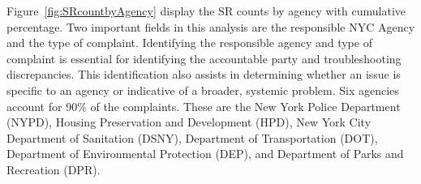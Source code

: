 \documentclass[12pt, titlepage]{article}
\begin{document}
Figure~\ref{fig:SRcountbyAgency} display the SR counts by agency with
cumulative percentage. Two important fields in this analysis are the
responsible NYC Agency and the type of complaint. Identifying the 
responsible agency and type of complaint is essential 
for identifying the accountable party and troubleshooting discrepancies. 
This identification also assists in determining whether an issue is 
specific to an agency or indicative of a broader, systemic problem. 
Six agencies account for 90\% of the complaints. These are the New York
Police Department (NYPD), Housing Preservation and Development (HPD),
New York City Department of Sanitation (DSNY), Department of
Transportation (DOT), Department of Environmental Protection (DEP),
and Department of Parks and Recreation (DPR).

\end{document}
